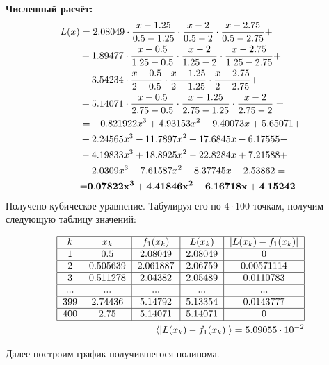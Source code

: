 \documentclass[a4paper, 14pt]{article}
\begin{document}
{\huge{\textbf{Численный расчёт:}}}
\begin{align} %
    L(x) &=
       2.08049\cdot\frac{x-1.25}{0.5-1.25}\cdot\frac{x-2}{0.5-2}\cdot\frac{x-2.75}{0.5-2.75} +\\
    &+ 1.89477\cdot\frac{x-0.5}{1.25-0.5}\cdot\frac{x-2}{1.25-2}\cdot\frac{x-2.75}{1.25-2.75} +\\
    &+ 3.54234\cdot\frac{x-0.5}{2-0.5}\cdot\frac{x-1.25}{2-1.25}\cdot\frac{x-2.75}{2-2.75} +\\
    &+ 5.14071\cdot\frac{x-0.5}{2.75-0.5}\cdot\frac{x-1.25}{2.75-1.25}\cdot\frac{x-2}{2.75-2} =\\
    &= -0.821922 x^3 + 4.93153 x^2 - 9.40073 x + 5.65071 +\\
    &+ 2.24565 x^3 - 11.7897 x^2 + 17.6845 x - 6.17555 -\\
    &- 4.19833 x^3 + 18.8925 x^2 - 22.8284 x + 7.21588 +\\
    &+ 2.0309 x^3 - 7.61587 x^2 + 8.37745 x - 2.53862 = \\
    &\bf{=} 0.07822 x^3 + 4.41846 x^2 - 6.16718 x + 4.15242
\end{align}
Получено кубическое уравнение. Табулируя его по $4\cdot100$ точкам, получим следующую таблицу значений:

{\Large
\begin{center}
\begin{align}
    \begin{tabular}{|c|c|c|c|c|}
        \hline
        $k$ & $x_k$ & $f_1(x_k)$ & $L(x_k)$ & $|L(x_k)-f_1(x_k)|$ \\
        \hline
        1 & 0.5      & 2.08049 & 2.08049 & 0 \\
        \hline
        2 & 0.505639 & 2.061887& 2.06759 &  0.00571114 \\
        \hline
        3 & 0.511278 & 2.04382 & 2.05489 &  0.0110783 \\
        \hline
        ... & ... & ... & ... &  ... \\
        \hline
        399 & 2.74436   & 5.14792 & 5.13354 & 0.0143777 \\
        \hline
        400 & 2.75 & 5.14071  & 5.14071 &  0 \\
        \hline
    \end{tabular}\\
    \langle|L(x_k)-f_1(x_k)|\rangle=5.09055\cdot10^{-2}
\end{align}
\end{center}}
Далее построим график получившегося полинома.
\newpage
\end{document}
